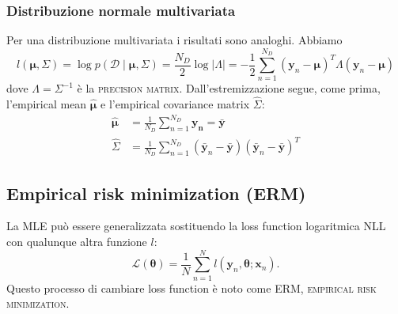 \documentclass[10pt]{article}
\renewcommand{\vec}[1]{\boldsymbol{#1}}
\newcommand{\HALF}{\frac{1}{2}}
\newcommand{\im}[1]{\textsc{#1}}
\newcommand{\cond}{\mid}
\newcommand{\pare}[1]{
	\ensuremath{\left(#1\right)}
}
\theoremstyle{definition}
\begin{document}
\subsubsection{Distribuzione normale multivariata}
Per una distribuzione multivariata i risultati sono analoghi. Abbiamo
\begin{equation}
l\pare{\vec{\mu}, \Sigma} = \log p\pare{\mathcal{D}\cond\vec{\mu},\Sigma} = \frac{N_D}{2}\log\left|\Lambda\right| = -\HALF\sum_{n=1}^{N_D}\pare{\vec{y}_n - \vec{\mu}}^T \Lambda\pare{\vec{y}_n - \vec{\mu}}
\end{equation}
dove $\Lambda = \Sigma^{-1}$ è la \im{precision matrix}. Dall'estremizzazione segue, come prima, l'empirical mean $\hat{\vec{\mu}}$ e l'empirical covariance matrix $\hat{\Sigma}$:
\begin{align}
\hat{\vec{\mu}} &= \frac{1}{N_D}\sum_{n=1}^{N_D}\vec{y_n} = \bar{\vec{y}} \\
\hat{\Sigma} &= \frac{1}{N_D}\sum_{n=1}^{N_D}\pare{\bar{\vec{y}}_n - \bar{\vec{y}}}\pare{\bar{\vec{y}}_n - \bar{\vec{y}}}^T 
\end{align}

\subsection{Empirical risk minimization (ERM)}
La MLE può essere generalizzata sostituendo la loss function logaritmica NLL con qualunque altra funzione $l$:
\begin{equation}
\mathcal{L}\pare{\vec{\theta}} = \frac{1}{N}\sum_{n=1}^N l\pare{\vec{y}_n, \vec{\theta}; \vec{x}_n}.
\end{equation}
Questo processo di cambiare loss function è noto come ERM, \im{empirical risk minimization}. %
\end{document}
